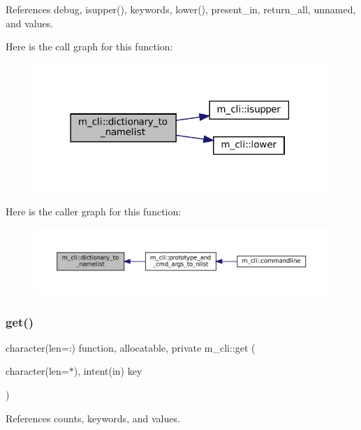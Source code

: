 References debug, isupper(), keywords, lower(), present\+\_\+in, return\+\_\+all, unnamed, and values.

Here is the call graph for this function\+:
\nopagebreak
\begin{figure}[H]
\begin{center}
\leavevmode
\includegraphics[width=314pt]{namespacem__cli_a7e5041efcad56387232475a3ae728634_cgraph}
\end{center}
\end{figure}
Here is the caller graph for this function\+:
\nopagebreak
\begin{figure}[H]
\begin{center}
\leavevmode
\includegraphics[width=350pt]{namespacem__cli_a7e5041efcad56387232475a3ae728634_icgraph}
\end{center}
\end{figure}
\mbox{\label{namespacem__cli_a45783c194a1484042f63c58b180ca8df}} 
\subsubsection{\texorpdfstring{get()}{get()}}
{\footnotesize\ttfamily character(len=\+:) function, allocatable, private m\+\_\+cli\+::get (\begin{DoxyParamCaption}\item[{character(len=$\ast$), intent(in)}]{key }\end{DoxyParamCaption})\hspace{0.3cm}{\ttfamily [private]}}



References counts, keywords, and values.

